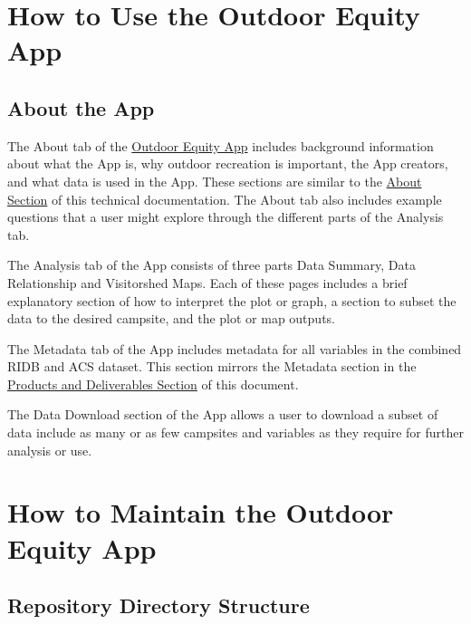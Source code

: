 \documentclass[
  11 pt,
  openany]{book}
\begin{document}
\hypertarget{how-to-use-the-outdoor-equity-app}{%
\section{How to Use the Outdoor Equity App}\label{how-to-use-the-outdoor-equity-app}}

\hypertarget{about-the-app}{%
\subsection{About the App}\label{about-the-app}}

The About tab of the \href{https://shinyapps.bren.ucsb.edu/oe_app/}{Outdoor Equity App} includes background information about what the App is, why outdoor recreation is important, the App creators, and what data is used in the App. These sections are similar to the \protect\hyperlink{about}{About Section} of this technical documentation. The About tab also includes example questions that a user might explore through the different parts of the Analysis tab.

The Analysis tab of the App consists of three parts Data Summary, Data Relationship and Visitorshed Maps. Each of these pages includes a brief explanatory section of how to interpret the plot or graph, a section to subset the data to the desired campsite, and the plot or map outputs.

The Metadata tab of the App includes metadata for all variables in the combined RIDB and ACS dataset. This section mirrors the Metadata section in the \protect\hyperlink{products-and-deliverables}{Products and Deliverables Section} of this document.

The Data Download section of the App allows a user to download a subset of data include as many or as few campsites and variables as they require for further analysis or use.

\hypertarget{how-to-maintain-the-outdoor-equity-app}{%
\section{How to Maintain the Outdoor Equity App}\label{how-to-maintain-the-outdoor-equity-app}}

\hypertarget{repository-directory-structure}{%
\subsection{Repository Directory Structure}\label{repository-directory-structure}}
\end{document}
